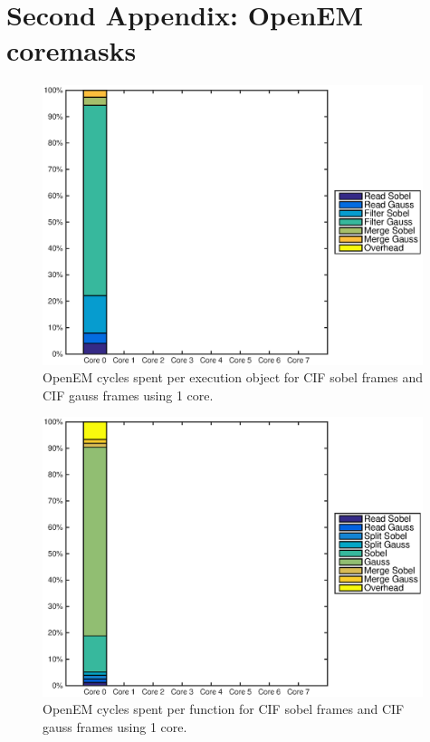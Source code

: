 \chapter{Second Appendix: OpenEM coremasks}

\begin{figure}[h!]
    \begin{center}
        \includegraphics[width=0.99\textwidth]{images/openem_cifcif_1cores_eo.eps}
        \caption{OpenEM cycles spent per execution object for CIF sobel frames and CIF gauss frames using 1 core.}
        \label{fig:oem1coreeo}
    \end{center}
\end{figure}

\begin{figure}[h!]
    \begin{center}
        \includegraphics[width=0.99\textwidth]{images/openem_cifcif_1cores_func.eps}
        \caption{OpenEM cycles spent per function for CIF sobel frames and CIF gauss frames using 1 core.}
        \label{fig:oem1corefunc}
    \end{center}
\end{figure}


